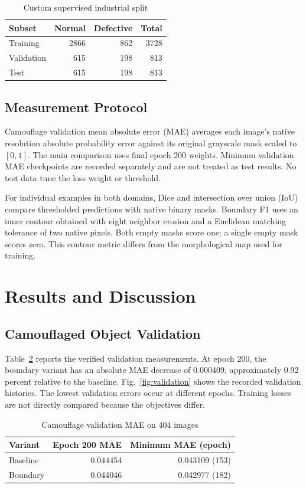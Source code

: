 \documentclass[conference,letterpaper]{IEEEtran}
\begin{document}
\begin{table}[t]
\caption{Custom supervised industrial split}
\label{tab:split}
\centering
\begin{tabular}{lrrr}
\hline
Subset & Normal & Defective & Total\\
\hline
Training & 2866 & 862 & 3728\\
Validation & 615 & 198 & 813\\
Test & 615 & 198 & 813\\
\hline
\end{tabular}
\end{table}

\subsection{Measurement Protocol}
Camouflage validation mean absolute error (MAE) averages each image's native resolution absolute probability error against its original grayscale mask scaled to $[0,1]$. The main comparison uses final epoch 200 weights. Minimum validation MAE checkpoints are recorded separately and are not treated as test results. No test data tune the loss weight or threshold.

For individual examples in both domains, Dice and intersection over union (IoU) compare thresholded predictions with native binary masks. Boundary F1 uses an inner contour obtained with eight neighbor erosion and a Euclidean matching tolerance of two native pixels. Both empty masks score one; a single empty mask scores zero. This contour metric differs from the morphological map used for training.

\section{Results and Discussion}
\subsection{Camouflaged Object Validation}
Table~\ref{tab:validation} reports the verified validation measurements. At epoch 200, the boundary variant has an absolute MAE decrease of 0.000409, approximately 0.92 percent relative to the baseline. Fig.~\ref{fig:validation} shows the recorded validation histories. The lowest validation errors occur at different epochs. Training losses are not directly compared because the objectives differ.

\begin{table}[t]
\caption{Camouflage validation MAE on 404 images}
\label{tab:validation}
\centering
\begin{tabular}{lrr}
\hline
Variant & Epoch 200 MAE & Minimum MAE (epoch)\\
\hline
Baseline & 0.044454 & 0.043109 (153)\\
Boundary & 0.044046 & 0.042977 (182)\\
\hline
\end{tabular}
\end{table}
\end{document}
